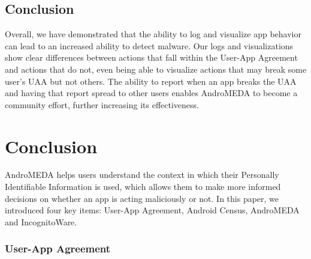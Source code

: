 \documentclass{acm_proc_article-sp}
\begin{document}
\subsection{Conclusion}
Overall, we have demonstrated that the ability to log and visualize app behavior can lead to an increased ability to detect malware. Our logs and visualizations show clear differences between actions that fall within the User-App Agreement and actions that do not, even being able to visualize actions that may break some user's UAA but not others. The ability to report when an app breaks the UAA and having that report spread to other users enables AndroMEDA to become a community effort, further increasing its effectiveness.






































\section{Conclusion}
\label{sec:conclusion}
AndroMEDA helps users understand the context in which their Personally Identifiable Information is used, which allows them to make more informed decisions on whether an app is acting maliciously or not. In this paper, we introduced four key items: User-App Agreement, Android Census, AndroMEDA and IncognitoWare.

\subsubsection{User-App Agreement}
\end{document}
